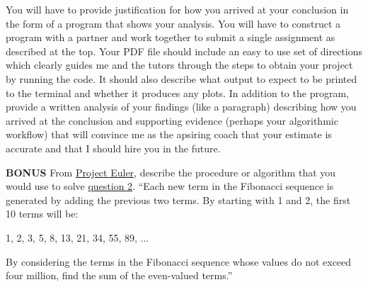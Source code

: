 \documentclass[12pt]{article}
\begin{document}
\newline
\newline
You will have to provide justification for how you arrived at your conclusion in the form of a program that shows your analysis.  You will have to construct a program with a partner and work together to submit a single assignment as described at the top.  Your PDF file should include an easy to use set of directions which clearly guides me and the tutors through the steps to obtain your project by running the code.  It should also describe what output to expect to be printed to the terminal and whether it produces any plots.
\newline
\newline
In addition to the program, provide a written analysis of your findings (like a paragraph) describing how you arrived at the conclusion and supporting evidence (perhaps your algorithmic workflow) that will convince me as the apsiring coach that your estimate is accurate and that I should hire you in the future.

\newpage
\textbf{BONUS}
\newline
From \href{https://projecteuler.net}{Project Euler}, describe the procedure or algorithm that you would use to solve \href{https://projecteuler.net/problem=2}{question 2}.
\newline
\newline
``Each new term in the Fibonacci sequence is generated by adding the previous two terms. By starting with 1 and 2, the first 10 terms will be:
\begin{center}
1, 2, 3, 5, 8, 13, 21, 34, 55, 89, ...
\end{center}
By considering the terms in the Fibonacci sequence whose values do not exceed four million, find the sum of the even-valued terms.''
\end{document}
